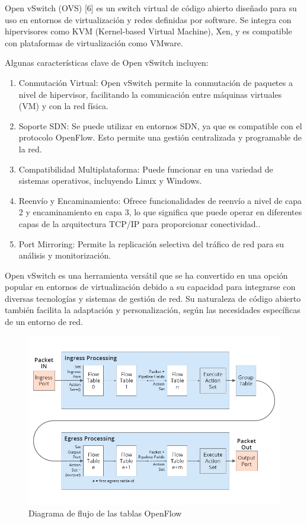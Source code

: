 \documentclass[a4paper, 12pt]{book}
\begin{document}
	Open vSwitch (OVS) [6] es un switch virtual de código abierto diseñado para su uso en entornos de virtualización y redes definidas por software. Se integra con hipervisores como KVM (Kernel-based Virtual Machine), Xen, y es compatible con plataformas de virtualización como VMware.
	
	Algunas características clave de Open vSwitch incluyen:
	
	\begin{enumerate}
		\item Conmutación Virtual: Open vSwitch permite la conmutación de paquetes a nivel de hipervisor, facilitando la comunicación entre máquinas virtuales (VM) y con la red física.
		
		
		\item Soporte SDN: Se puede utilizar en entornos SDN, ya que es compatible con el protocolo OpenFlow. Esto permite una gestión centralizada y programable de la red.
		
		\item Compatibilidad Multiplataforma: Puede funcionar en una variedad de sistemas operativos, incluyendo Linux y Windows.
		
		\item Reenvío y Encaminamiento: Ofrece funcionalidades de reenvío a nivel de capa 2 y encaminamiento en capa 3, lo que significa que puede operar en diferentes capas de la arquitectura TCP/IP para proporcionar conectividad..
		
		\item Port Mirroring: Permite la replicación selectiva del tráfico de red para su análisis y monitorización.
		
	\end{enumerate}
	
	Open vSwitch es una herramienta versátil que se ha convertido en una opción popular en entornos de virtualización debido a su capacidad para integrarse con diversas tecnologías y sistemas de gestión de red. Su naturaleza de código abierto también facilita la adaptación y personalización, según las necesidades específicas de un entorno de red.
	
	\begin{figure}[H]
		\centering
		\includegraphics[width=16cm, keepaspectratio]{img/DiagramaOpenFlow}
		\caption{Diagrama de flujo de las tablas OpenFlow}
		\label{figura:DiagramaOpenFlow}
	\end{figure}
	
\end{document}

